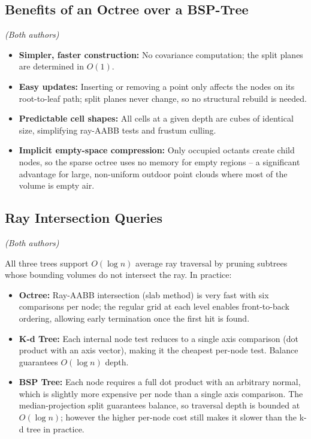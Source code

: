 \documentclass[12pt,a4paper]{article}
\begin{document}
\subsection{Benefits of an Octree over a BSP-Tree}
\textit{(Both authors)}

\begin{itemize}
  \item \textbf{Simpler, faster construction:} No covariance computation;
        the split planes are determined in $O(1)$.
  \item \textbf{Easy updates:} Inserting or removing a point only affects the
        nodes on its root-to-leaf path; split planes never change, so no
        structural rebuild is needed.
  \item \textbf{Predictable cell shapes:} All cells at a given depth are
        cubes of identical size, simplifying ray-AABB tests and frustum culling.
  \item \textbf{Implicit empty-space compression:} Only occupied octants
        create child nodes, so the sparse octree uses no memory for empty
        regions -- a significant advantage for large, non-uniform outdoor point
        clouds where most of the volume is empty air.
\end{itemize}

\subsection{Ray Intersection Queries}
\textit{(Both authors)}

All three trees support $O(\log n)$ average ray traversal by pruning subtrees
whose bounding volumes do not intersect the ray. In practice:

\begin{itemize}
  \item \textbf{Octree:} Ray-AABB intersection (slab method) is very fast
        with six comparisons per node; the regular grid at each level enables
        front-to-back ordering, allowing early termination once the first hit
        is found.
  \item \textbf{K-d Tree:} Each internal node test reduces to a single axis
        comparison (dot product with an axis vector), making it the cheapest
        per-node test. Balance guarantees $O(\log n)$ depth.
  \item \textbf{BSP Tree:} Each node requires a full dot product with an
        arbitrary normal, which is slightly more expensive per node than a
        single axis comparison. The median-projection split guarantees balance,
        so traversal depth is bounded at $O(\log n)$; however the higher
        per-node cost still makes it slower than the k-d tree in practice.
\end{itemize}
\end{document}
